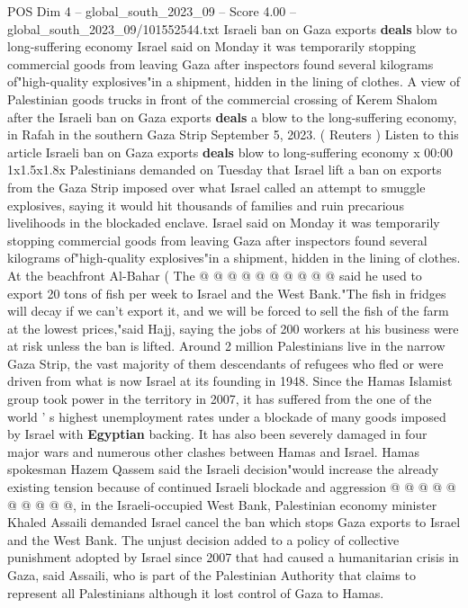 \begin{textsample}{POS Dim 4 – global\_south\_2023\_09 – Score 4.00 – global\_south\_2023\_09/101552544.txt}  \label{ex:f4_pos_422}
Israeli ban on Gaza exports \textbf{deals} blow to long-suffering economy Israel said on Monday it was temporarily stopping commercial goods from leaving Gaza after inspectors found several kilograms of"high-quality explosives"in a shipment, hidden in the lining of clothes.
A view of Palestinian goods trucks in front of the commercial crossing of Kerem Shalom after the Israeli ban on Gaza exports \textbf{deals} a blow to the long-suffering economy, in Rafah in the southern Gaza Strip September 5, 2023. ( Reuters ) Listen to this article Israeli ban on Gaza exports \textbf{deals} blow to long-suffering economy x 00:00 1x1.5x1.8x Palestinians demanded on Tuesday that Israel lift a ban on exports from the Gaza Strip imposed over what Israel called an attempt to smuggle explosives, saying it would hit thousands of families and ruin precarious livelihoods in the blockaded enclave.
Israel said on Monday it was temporarily stopping commercial goods from leaving Gaza after inspectors found several kilograms of"high-quality explosives"in a shipment, hidden in the lining of clothes.
At the beachfront Al-Bahar ( The @ @ @ @ @ @ @ @ @ @ said he used to export 20 tons of fish per week to Israel and the West Bank."The fish in fridges will decay if we can't export it, and we will be forced to sell the fish of the farm at the lowest prices,"said Hajj, saying the jobs of 200 workers at his business were at risk unless the ban is lifted.
Around 2 million Palestinians live in the narrow Gaza Strip, the vast majority of them descendants of refugees who fled or were driven from what is now Israel at its founding in 1948.
Since the Hamas Islamist group took power in the territory in 2007, it has suffered from the one of the world ' s highest unemployment rates under a blockade of many goods imposed by Israel with \textbf{Egyptian} backing.
It has also been severely damaged in four major wars and numerous other clashes between Hamas and Israel.
Hamas spokesman Hazem Qassem said the Israeli decision"would increase the already existing tension because of continued Israeli blockade and aggression @ @ @ @ @ @ @ @ @ @, in the Israeli-occupied West Bank, Palestinian economy minister Khaled Assaili demanded Israel cancel the ban which stops Gaza exports to Israel and the West Bank.
The unjust decision added to a policy of collective punishment adopted by Israel since 2007 that had caused a humanitarian crisis in Gaza, said Assaili, who is part of the Palestinian Authority that claims to represent all Palestinians although it lost control of Gaza to Hamas.

\end{textsample}
